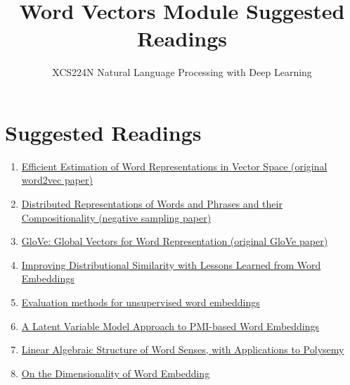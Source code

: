 \documentclass{article}
\title{Word Vectors Module Suggested Readings}
\author{XCS224N Natural Language Processing with Deep Learning}
\date{}
\begin{document}
\maketitle

\section{Suggested Readings}
\begin{enumerate}
    \item \href{https://arxiv.org/pdf/1301.3781.pdf}{Efficient Estimation of Word Representations in Vector Space (original word2vec paper)}
    \item \href{https://proceedings.neurips.cc/paper/2013/file/9aa42b31882ec039965f3c4923ce901b-Paper.pdf}{Distributed Representations of Words and Phrases and their Compositionality (negative sampling paper)}
    \item \href{https://nlp.stanford.edu/pubs/glove.pdf}{GloVe: Global Vectors for Word Representation (original GloVe paper)}
    \item \href{https://www.aclweb.org/anthology/Q15-1016.pdf}{Improving Distributional Similarity with Lessons Learned from Word Embeddings}
    \item \href{https://www.aclweb.org/anthology/D15-1036.pdf}{Evaluation methods for unsupervised word embeddings}
    \item \href{https://www.aclweb.org/anthology/Q16-1028.pdf}{A Latent Variable Model Approach to PMI-based Word Embeddings}
    \item \href{https://transacl.org/ojs/index.php/tacl/article/viewFile/1346/320}{Linear Algebraic Structure of Word Senses, with Applications to Polysemy}
    \item \href{https://papers.nips.cc/paper/2018/file/b534ba68236ba543ae44b22bd110a1d6-Paper.pdf}{On the Dimensionality of Word Embedding}
\end{enumerate}
\end{document}
